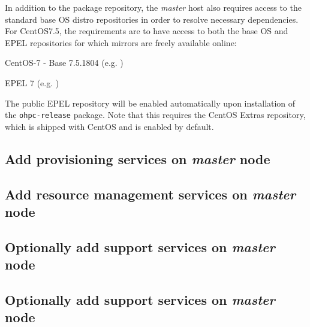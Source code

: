 \documentclass[letterpaper]{article}
\newcommand{\baseOS}{CentOS7.5}
\begin{document}
In addition to the \OHPC{} package repository, the {\em master} host also
requires access to the standard base OS distro repositories in order to resolve
necessary dependencies. For \baseOS{}, the requirements are to have access to
both the base OS and EPEL repositories for which mirrors are freely available online:

\begin{itemize*}
\item CentOS-7 - Base 7.5.1804
  (e.g. \href{http://mirror.centos.org/centos-7/7/os/x86\_64}
             {\color{blue}{http://mirror.centos.org/centos-7/7/os/x86\_64}} )
\item EPEL 7 (e.g. \href{http://download.fedoraproject.org/pub/epel/7/x86\_64}
                        {\color{blue}{http://download.fedoraproject.org/pub/epel/7/x86\_64}} )
\end{itemize*}

\noindent The public EPEL repository will be enabled automatically upon installation of the 
\texttt{ohpc-release} package. Note that this requires the CentOS Extras
repository, which is shipped with CentOS and is enabled by default.




\subsection{Add provisioning services on {\em master} node} \label{sec:add_provisioning}




\subsection{Add resource management services on {\em master} node} \label{sec:add_rm}


\subsection{Optionally add \InfiniBand{} support services on {\em master} node} \label{sec:add_ofed}


\subsection{Optionally add \OmniPath{} support services on {\em master} node} \label{sec:add_opa}

\end{document}
